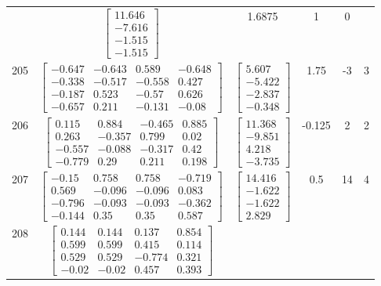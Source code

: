 \documentclass[a4paper,12pt]{article}
\begin{document}
\begin{tabular}{c c c c c c}
&
$\begin{bmatrix} 11.646 \\ -7.616 \\ -1.515 \\ -1.515 \end{bmatrix}$
&
1.6875
&
1
&
0
\\
205
&
$\begin{bmatrix} -0.647 & -0.643 & 0.589 & -0.648 \\ -0.338 & -0.517 & -0.558 & 0.427 \\ -0.187 & 0.523 & -0.57 & 0.626 \\ -0.657 & 0.211 & -0.131 & -0.08 \end{bmatrix}$
&
$\begin{bmatrix} 5.607 \\ -5.422 \\ -2.837 \\ -0.348 \end{bmatrix}$
&
1.75
&
-3
&
3
\\
206
&
$\begin{bmatrix} 0.115 & 0.884 & -0.465 & 0.885 \\ 0.263 & -0.357 & 0.799 & 0.02 \\ -0.557 & -0.088 & -0.317 & 0.42 \\ -0.779 & 0.29 & 0.211 & 0.198 \end{bmatrix}$
&
$\begin{bmatrix} 11.368 \\ -9.851 \\ 4.218 \\ -3.735 \end{bmatrix}$
&
-0.125
&
2
&
2
\\
207
&
$\begin{bmatrix} -0.15 & 0.758 & 0.758 & -0.719 \\ 0.569 & -0.096 & -0.096 & 0.083 \\ -0.796 & -0.093 & -0.093 & -0.362 \\ -0.144 & 0.35 & 0.35 & 0.587 \end{bmatrix}$
&
$\begin{bmatrix} 14.416 \\ -1.622 \\ -1.622 \\ 2.829 \end{bmatrix}$
&
0.5
&
14
&
4
\\
208
&
$\begin{bmatrix} 0.144 & 0.144 & 0.137 & 0.854 \\ 0.599 & 0.599 & 0.415 & 0.114 \\ 0.529 & 0.529 & -0.774 & 0.321 \\ -0.02 & -0.02 & 0.457 & 0.393 \end{bmatrix}$

\end{tabular}
\end{document}
